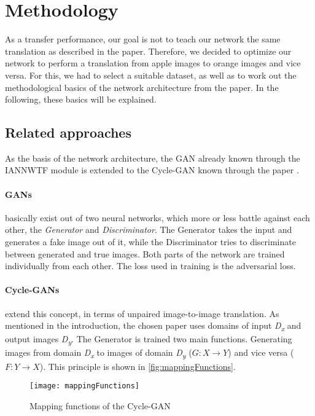 \documentclass[fleqn,10pt]{SelfArx} %
\begin{document}
\section{Methodology}

As a transfer performance, our goal is not to teach our network the same translation as described in the paper.  Therefore, we decided to optimize our network to perform a translation from apple images to orange images and vice versa. For this, we had to select a suitable dataset, as well as to work out the methodological basics of the network architecture from the paper. In the following, these basics will be explained.

\subsection{Related approaches}
As the basis of the network architecture, the \ac{GAN} already known through the \ac{IANNWTF} module is extended to the Cycle-\ac{GAN} known through the paper \cite{image-to-image-ccan}.

\paragraph{\acl{GAN}s} basically exist out of two neural networks, which more or less battle against each other, the \textit{Generator} and \textit{Discriminator}. The Generator takes the input and generates a fake image out of it, while the Discriminator tries to discriminate between generated and true images. Both parts of the network are trained individually from each other. The loss used in training is the adversarial loss.~\cite{Introduction-to-Cycle-GANs, GAN-Courseware}

\paragraph{Cycle-\ac{GAN}s} extend this concept, in terms of unpaired image-to-image translation. As mentioned in the introduction, the chosen paper uses domains of input \textit{D\textsubscript{x}} and output images \textit{D\textsubscript{y}}. The Generator is trained two main functions. Generating images from domain \textit{D\textsubscript{x}} to images of domain \textit{D\textsubscript{y}} ($G: X \rightarrow Y$) and vice versa ($F: Y \rightarrow X$). This principle is shown in \autoref{fig:mappingFunctions}.~\cite{image-to-image-ccan}

\begin{figure} \centering 
	\texttt{[image: mappingFunctions]}
	\caption{Mapping functions of the Cycle-\ac{GAN}~\cite{image-to-image-ccan}}
	\label{fig:mappingFunctions}
\end{figure}
\end{document}
